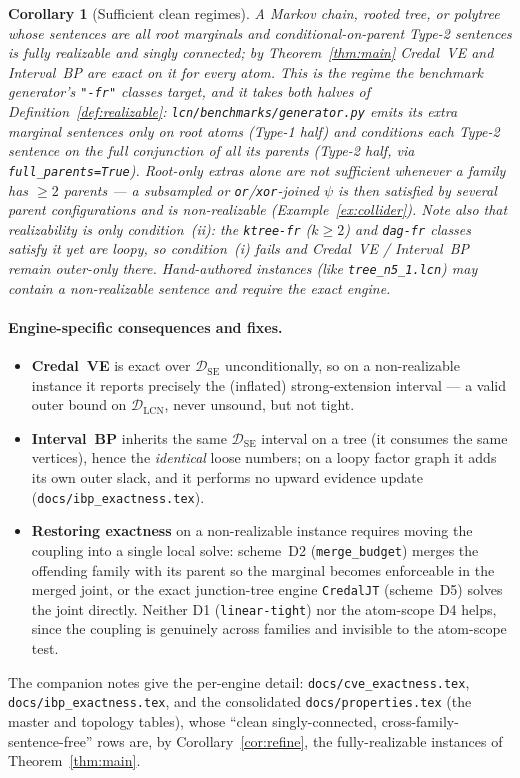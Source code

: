 \documentclass[11pt]{article}
\newtheorem{corollary}{Corollary}
\newcommand{\DSE}{\mathcal{D}_{\mathrm{SE}}}
\newcommand{\DLCN}{\mathcal{D}_{\mathrm{LCN}}}
\begin{document}
\begin{corollary}[Sufficient clean regimes]\label{cor:clean}
A Markov chain, rooted tree, or polytree whose sentences are all root marginals and
conditional-on-parent Type-2 sentences is fully realizable and singly connected; by
Theorem~\ref{thm:main} Credal~VE and Interval~BP are exact on it for every atom. This is the regime the
benchmark generator's \texttt{"-fr"} classes target, and it takes \emph{both} halves of
Definition~\ref{def:realizable}: \texttt{lcn/benchmarks/generator.py} emits its extra marginal sentences
only on \emph{root} atoms (Type-1 half) \emph{and} conditions each Type-2 sentence on the full
conjunction of \emph{all} its parents (Type-2 half, via \texttt{full\_parents=True}). Root-only extras
alone are not sufficient whenever a family has $\ge2$ parents --- a subsampled or
\texttt{or}/\texttt{xor}-joined $\psi$ is then satisfied by several parent configurations and is
non-realizable (Example~\ref{ex:collider}). Note also that realizability is only condition~(ii): the
\texttt{ktree-fr} ($k\ge2$) and \texttt{dag-fr} classes satisfy it yet are \emph{loopy}, so
condition~(i) fails and Credal~VE / Interval~BP remain outer-only there. Hand-authored instances (like
\texttt{tree\_n5\_1.lcn}) may contain a non-realizable sentence and require the exact engine.
\end{corollary}

\paragraph{Engine-specific consequences and fixes.}
\begin{itemize}
  \item \textbf{Credal~VE} is exact over $\DSE$ unconditionally, so on a non-realizable instance it
    reports precisely the (inflated) strong-extension interval --- a valid outer bound on $\DLCN$,
    never unsound, but not tight.
  \item \textbf{Interval~BP} inherits the same $\DSE$ interval on a tree (it consumes the same
    vertices), hence the \emph{identical} loose numbers; on a loopy factor graph it adds its own outer
    slack, and it performs no upward evidence update (\texttt{docs/ibp\_exactness.tex}).
  \item \textbf{Restoring exactness} on a non-realizable instance requires moving the coupling into a
    single local solve: scheme~D2 (\texttt{merge\_budget}) merges the offending family with its
    parent so the marginal becomes enforceable in the merged joint, or the exact junction-tree engine
    \texttt{CredalJT} (scheme~D5) solves the joint directly. Neither D1 (\texttt{linear-tight}) nor the
    atom-scope D4 helps, since the coupling is genuinely across families and invisible to the
    atom-scope test.
\end{itemize}

\noindent The companion notes give the per-engine detail: \texttt{docs/cve\_exactness.tex},
\texttt{docs/ibp\_exactness.tex}, and the consolidated \texttt{docs/properties.tex} (the master and
topology tables), whose ``clean singly-connected, cross-family-sentence-free'' rows are, by
Corollary~\ref{cor:refine}, the fully-realizable instances of Theorem~\ref{thm:main}.
\end{document}
